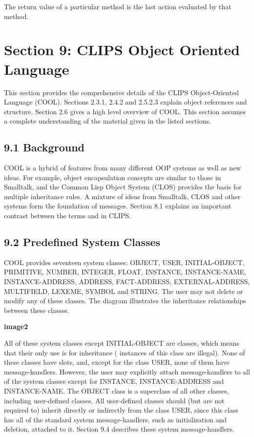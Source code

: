 \documentclass[letterpaper,10pt,english]{sphinxmanual}
\begin{document}
The return value of a particular method is the last action evaluated by
that method.

\label{\detokenize{generic:section-6}}

\chapter{Section 9: CLIPS Object Oriented Language}
\label{\detokenize{cool:section-9-clips-object-oriented-language}}\label{\detokenize{cool::doc}}
This section provides the comprehensive details of the CLIPS
Object-Oriented Language (COOL). Sections 2.3.1, 2.4.2 and 2.5.2.3
explain object references and structure. Section 2.6 gives a high level
overview of COOL. This section assumes a complete understanding of the
material given in the listed sections.


\section{9.1 Background}
\label{\detokenize{cool:background}}
COOL is a hybrid of features from many different OOP systems as well as
new ideas. For example, object encapsulation concepts are similar to
those in Smalltalk, and the Common Lisp Object System (CLOS) provides
the basis for multiple inheritance rules. A mixture of ideas from
Smalltalk, CLOS and other systems form the foundation of messages.
Section 8.1 explains an important contrast between the terms 
and  in CLIPS.


\section{9.2 Predefined System Classes}
\label{\detokenize{cool:predefined-system-classes}}
COOL provides seventeen system classes: OBJECT, USER, INITIAL-OBJECT,
PRIMITIVE, NUMBER, INTEGER, FLOAT, INSTANCE, INSTANCE-NAME,
INSTANCE-ADDRESS, ADDRESS, FACT-ADDRESS, EXTERNAL-ADDRESS, MULTIFIELD,
LEXEME, SYMBOL and STRING. The user may not delete or modify any of
these classes. The diagram illustrates the inheritance relationships
between these classes.

{\color{red}\bfseries{}\textbar{}image2\textbar{}}

All of these system classes except INITIAL-OBJECT are 
classes, which means that their only use is for inheritance (
instances of this class are illegal). None of these classes have slots,
and, except for the class USER, none of them have message-handlers.
However, the user may explicitly attach message-handlers to all of the
system classes except for INSTANCE, INSTANCE-ADDRESS and INSTANCE-NAME.
The OBJECT class is a superclass of all other classes, including
user-defined classes. All user-defined classes should (but are not
required to) inherit directly or indirectly from the class USER, since
this class has all of the standard system message-handlers, such as
initialization and deletion, attached to it. Section 9.4 describes these
system message-handlers.
\end{document}
